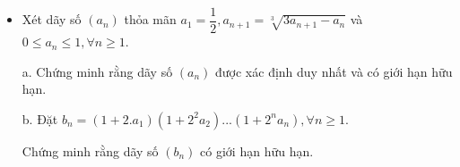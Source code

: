 \documentclass[11pt]{scrartcl}
\begin{document}
\begin{itemize}[label=, leftmargin=0em, itemsep=-0em]

    \item \begin{btvn}
        Xét dãy số $(a_n)$ thỏa mãn $a_1=\dfrac{1}{2}, a_{n+1}=\sqrt[3]{3a_{n+1}-a_n}$ và $0\le a_n\le 1, \forall n\ge 1.$

a. Chứng minh rằng dãy số $(a_n)$ được xác định duy nhất và có giới hạn hữu hạn.

b. Đặt $b_n=(1+2.a_1)(1+2^2a_2)...(1+2^na_n), \forall n\ge 1.$

Chứng minh rằng dãy số $(b_n)$ có giới hạn hữu hạn.
    \end{btvn}

\end{itemize}
\end{document}
